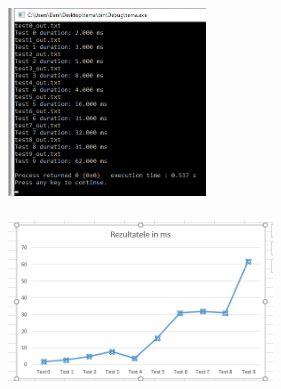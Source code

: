 \documentclass{article}
\begin{document}
\begin{figure}[h]
\includegraphics[width=5.25cm,height=5.25cm]{Figura1}
\includegraphics[width=7cm,height=5cm]{Grafic1}
\end{figure}


 
\end{document}
